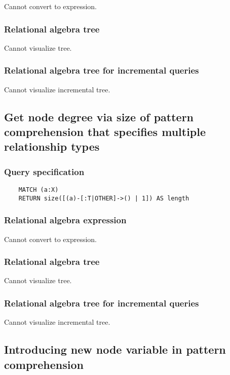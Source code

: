 	Cannot convert to expression.

	\subsubsection*{Relational algebra tree}

	Cannot visualize tree.

	\subsubsection*{Relational algebra tree for incremental queries}

	Cannot visualize incremental tree.
	\subsection{Get node degree via size of pattern comprehension that specifies multiple relationship types}

	\subsubsection*{Query specification}

	\begin{lstlisting}
	MATCH (a:X)
	RETURN size([(a)-[:T|OTHER]->() | 1]) AS length
	\end{lstlisting}


	\subsubsection*{Relational algebra expression}

	Cannot convert to expression.

	\subsubsection*{Relational algebra tree}

	Cannot visualize tree.

	\subsubsection*{Relational algebra tree for incremental queries}

	Cannot visualize incremental tree.
	\subsection{Introducing new node variable in pattern comprehension}

